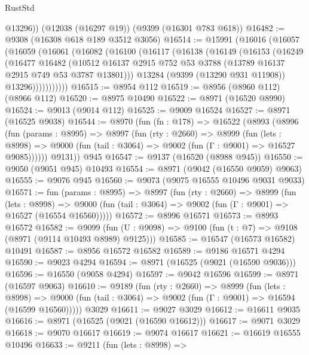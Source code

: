 \begin{lexlean}{RustStd}
\begin{coremodule}
        @13296))
    (@12038 (@16297 @19))
    (@9399 (@16301 @783 @618))
@16482 := @9308 (@16308 @618 @189 @3512 @3056)
@16514 := @15991
    (@16016
      (@16057
        (@16059
          (@16061
            (@16082
              (@16100
                (@16117
                  (@16138
                    (@16149
                      (@16153
                        (@16249
                          (@16477
                            @16482
                            (@10512
                              @16137
                              @2915
                              @752
                              @53
                              @3788
                              (@13789 @16137 @2915 @749 @53 @3787 @13801)))
                          @13284
                          (@9399 (@13290 @931 @11908))
                          @13296)))))))))))
@16515 := @8954 @112
@16519 := @8956 (@8960 @112) (@8966 @112)
@16520 := @8975 @10490
@16522 := @8971 (@16520 @8990)
@16524 := @9013 (@9014 @112)
@16525 := @9009 @16524
@16527 := @8971 (@16525 @9038)
@16544 := @8970
    (fun (fn : @178) =>
    @16522
      (@8993
        (@8996
          (fun (params : @8995) =>
          @8997
            (fun (rty : @2660) =>
            @8999
              (fun (lets : @8998) =>
              @9000 (fun (tail : @3064) => @9002 (fun (Γ : @9001) => @16527 @9085))))))
        @9131))
    @945
@16547 := @9137 (@16520 (@8988 @945))
@16550 := @9050 (@9051 @945) @10493
@16554 := @8971 (@9042 (@16550 @9059) @9063)
@16555 := @9076 @945
@16560 := @9073 (@9075 @16555 @10496 @9031 @9033)
@16571 := fun (params : @8995) =>
  @8997
    (fun (rty : @2660) =>
    @8999
      (fun (lets : @8998) =>
      @9000 (fun (tail : @3064) => @9002 (fun (Γ : @9001) => @16527 (@16554 @16560)))))
@16572 := @8996 @16571
@16573 := @8993 @16572
@16582 := @9099
    (fun (U : @9098) => @9100 (fun (t : @7) => @9108 (@8971 (@9114 @10493 @8989) @9125)))
@16585 := @16547 (@16573 @16582) @10491
@16587 := @8956 @16572 @16582
@16589 := @9186 @16571 @4294
@16590 := @9023 @4294
@16594 := @8971 (@16525 (@9021 (@16590 @9036)))
@16596 := @16550 (@9058 @4294)
@16597 := @9042 @16596
@16599 := @8971 (@16597 @9063)
@16610 := @9189
    (fun (rty : @2660) =>
    @8999
      (fun (lets : @8998) =>
      @9000 (fun (tail : @3064) => @9002 (fun (Γ : @9001) => @16594 (@16599 @16560)))))
    @3029
@16611 := @9027 @3029
@16612 := @16611 @9035
@16616 := @8971 (@16525 (@9021 (@16590 @16612)))
@16617 := @9071 @3029
@16618 := @9070 @16617
@16619 := @9074 @16617
@16621 := @16619 @16555 @10496
@16633 := @9211
    (fun (lets : @8998) =>

\end{coremodule}
\end{lexlean}
